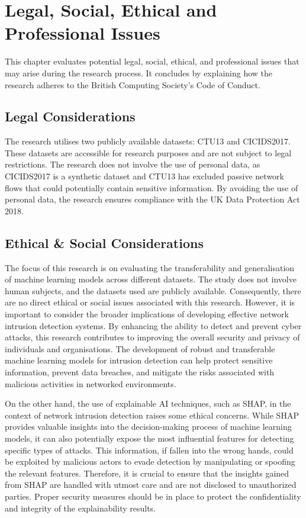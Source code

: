 \chapter{Legal, Social, Ethical and Professional Issues}
This chapter evaluates potential legal, social, ethical, and professional issues that may arise during the research process. It concludes by explaining how the research adheres to the British Computing Society's Code of Conduct.

\section{Legal Considerations}
The research utilises two publicly available datasets: CTU13\cite{garcia2014empirical} and CICIDS2017\cite{sharafaldin2018toward}. These datasets are accessible for research purposes and are not subject to legal restrictions. The research does not involve the use of personal data, as CICIDS2017 is a synthetic dataset and CTU13 has excluded passive network flows that could potentially contain sensitive information. By avoiding the use of personal data, the research ensures compliance with the UK Data Protection Act 2018.

\section{Ethical \& Social Considerations}
The focus of this research is on evaluating the transferability and generalisation of machine learning models across different datasets. The study does not involve human subjects, and the datasets used are publicly available. Consequently, there are no direct ethical or social issues associated with this research. However, it is important to consider the broader implications of developing effective network intrusion detection systems. By enhancing the ability to detect and prevent cyber attacks, this research contributes to improving the overall security and privacy of individuals and organisations. The development of robust and transferable machine learning models for intrusion detection can help protect sensitive information, prevent data breaches, and mitigate the risks associated with malicious activities in networked environments.

On the other hand, the use of explainable AI techniques, such as SHAP, in the context of network intrusion detection raises some ethical concerns. While SHAP provides valuable insights into the decision-making process of machine learning models, it can also potentially expose the most influential features for detecting specific types of attacks. This information, if fallen into the wrong hands, could be exploited by malicious actors to evade detection by manipulating or spoofing the relevant features. Therefore, it is crucial to ensure that the insights gained from SHAP are handled with utmost care and are not disclosed to unauthorized parties. Proper security measures should be in place to protect the confidentiality and integrity of the explainability results.


